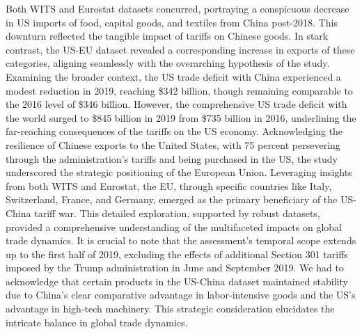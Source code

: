 \documentclass[12pt]{article}
\begin{document}
Both WITS and Eurostat datasets concurred, portraying a conspicuous decrease in US imports of food, capital goods, and textiles from China post-2018. This downturn reflected the tangible impact of tariffs on Chinese goods. In stark contrast, the US-EU dataset revealed a corresponding increase in exports of these categories, aligning seamlessly with the overarching hypothesis of the study. Examining the broader context, the US trade deficit with China experienced a modest reduction in 2019, reaching \$342 billion, though remaining comparable to the 2016 level of \$346 billion. However, the comprehensive US trade deficit with the world surged to \$845 billion in 2019 from \$735 billion in 2016, underlining the far-reaching consequences of the tariffs on the US economy. Acknowledging the resilience of Chinese exports to the United States, with 75 percent persevering through the administration's tariffs and being purchased in the US, the study underscored the strategic positioning of the European Union. Leveraging insights from both WITS and Eurostat, the EU, through specific countries like Italy, Switzerland, France, and Germany, emerged as the primary beneficiary of the US-China tariff war. This detailed exploration, supported by robust datasets, provided a comprehensive understanding of the multifaceted impacts on global trade dynamics. It is crucial to note that the assessment's temporal scope extends up to the first half of 2019, excluding the effects of additional Section 301 tariffs imposed by the Trump administration in June and September 2019. We had to acknowledge that certain products in the US-China dataset maintained stability due to China's clear comparative advantage in labor-intensive goods and the US's advantage in high-tech machinery. This strategic consideration elucidates the intricate balance in global trade dynamics. 
\end{document}
